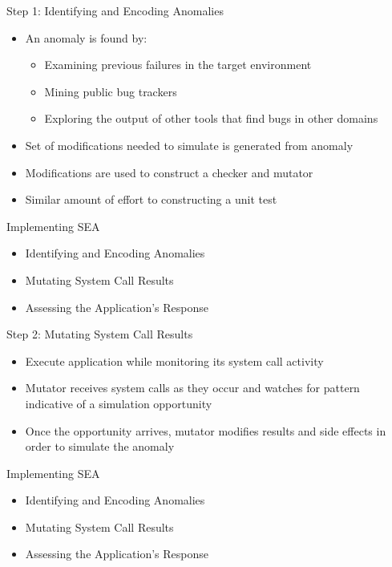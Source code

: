 \documentclass[pdf]{beamer}
\begin{document}
\begin{frame}{Step 1: Identifying and Encoding Anomalies}
  \begin{itemize}
    \item{An anomaly is found by:}
      \begin{itemize}
        \item{Examining previous failures in the target environment}
        \item{Mining public bug trackers}
        \item{Exploring the output of other tools that find bugs in other
          domains}
      \end{itemize}
    \item{Set of modifications needed to simulate is generated from anomaly}
    \item{Modifications are used to construct a checker and mutator}
    \item{Similar amount of effort to constructing a unit test}
  \end{itemize}
\end{frame}


\begin{frame}{Implementing SEA}
  \begin{itemize}
    \item{Identifying and Encoding Anomalies}
    \item{\textrightarrow{}Mutating System Call Results\textleftarrow{}}
    \item{Assessing the Application's Response}
  \end{itemize}
\end{frame}


\begin{frame}{Step 2: Mutating System Call Results}
  \begin{itemize}
    \item{Execute application while monitoring its system call activity}
    \item{Mutator receives system calls as they occur and watches for pattern
      indicative of a simulation opportunity}
    \item{Once the opportunity arrives, mutator modifies results and side effects
      in order to simulate the anomaly}
  \end{itemize}
\end{frame}


\begin{frame}{Implementing SEA}
  \begin{itemize}
    \item{Identifying and Encoding Anomalies}
    \item{Mutating System Call Results}
    \item{\textrightarrow{}Assessing the Application's Response\textleftarrow{}}
  \end{itemize}
\end{frame}
\end{document}
